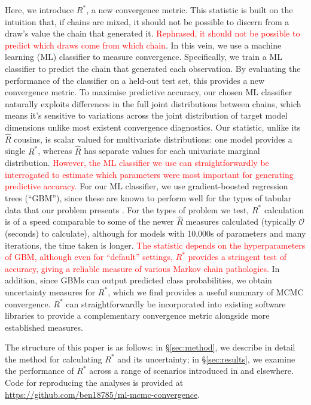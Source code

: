 \documentclass{article}
\begin{document}
Here, we introduce $R^*$, a new convergence metric. This statistic is built on the intuition that, if chains are mixed, it should not be possible to discern from a draw's value the chain that generated it. \textcolor{red}{Rephrased, it should not be possible to predict which draws come from which chain}. In this vein, we use a machine learning (ML) classifier to measure convergence. Specifically, we train a ML classifier to predict the chain that generated each observation. By evaluating the performance of the classifier on a held-out test set, this provides a new convergence metric. To maximise predictive accuracy, our chosen ML classifier naturally exploits differences in the full joint distributions between chains, which means it's sensitive to variations across the joint distribution of target model dimensions unlike most existent convergence diagnostics. Our statistic, unlike its $\widehat{R}$ cousins, is scalar valued for multivariate distributions: one model provides a single $R^*$, whereas $\widehat{R}$ has separate values for each univariate marginal distribution. \textcolor{red}{However, the ML classifier we use can straightforwardly be interrogated to estimate which parameters were most important for generating predictive accuracy.} For our ML classifier, we use gradient-boosted regression trees \citep{friedman2001greedy,greenwell2019package} (``GBM''), since these are known to perform well for the types of tabular data that our problem presents \citep{chollet2018}. For the types of problem we test, $R^*$ calculation is of a speed comparable to some of the newer $\widehat{R}$ measures calculated (typically $\mathcal{O}$(seconds) to calculate), although for models with 10,000s of parameters and many iterations, the time taken is longer. \textcolor{red}{The statistic depends on the hyperparameters of GBM, although even for ``default'' settings, $R^*$ provides a stringent test of accuracy, giving a reliable measure of various Markov chain pathologies.} In addition, since GBMs can output predicted class probabilities, we obtain uncertainty measures for $R^*$, which we find provides a useful summary of MCMC convergence. $R^*$ can straightforwardly be incorporated into existing software libraries to provide a complementary convergence metric alongside more established measures.

The structure of this paper is as follows: in \S\ref{sec:method}, we describe in detail the method for calculating $R^*$ and its uncertainty; in \S\ref{sec:results}, we examine the performance of $R^*$ across a range of scenarios introduced in \cite{vehtari2019rank} and elsewhere. Code for reproducing the analyses is provided at \url{https://github.com/ben18785/ml-mcmc-convergence}.
\end{document}
